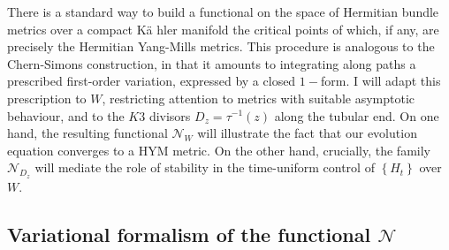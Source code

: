 \documentclass{article}
\begin{document}
There is a standard way \cite[\S 1.2]{ASDYM} to build a
functional on the space of Hermitian bundle metrics over a compact K\"{a}%
hler manifold the critical points of which, if any, are precisely the
Hermitian Yang-Mills metrics. This procedure is analogous
to the Chern-Simons construction, in that it amounts to integrating along paths a prescribed
first-order variation, expressed by a closed $1-$form. 
I will adapt this prescription to  $W$, restricting attention to metrics with suitable
asymptotic behaviour, and to the $K3$ divisors $D_{z}=\tau ^{-1}\left(
z\right) $ along the tubular end. 
On one hand, the resulting functional $\mathcal{N}_{W}
$ will illustrate the fact that our evolution equation converges
to a HYM metric. On the other hand, crucially, the family $\mathcal{N}_{D_{z}}$ will mediate the role of stability in the time-uniform control of $%
\left\{ H_{t}\right\} $ over $W$.

\subsection{Variational formalism of the functional $\mathcal{N}$}
 
\end{document}

